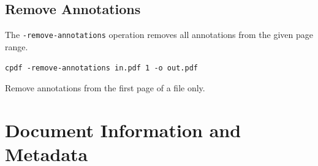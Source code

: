\documentclass[a4paper,makeidx]{memoir}
\begin{document}
  \section{Remove Annotations}
  The \texttt{-remove-annotations} operation removes all annotations from the
given page range.

  \begin{framed}
    \small\verb!cpdf -remove-annotations in.pdf 1 -o out.pdf!
    
    \vspace{2.5mm}
    \noindent Remove annotations from the first page of a file only.
  \end{framed}
\chapter{Document Information and Metadata}
\end{document}
